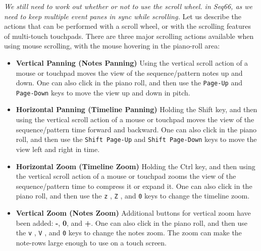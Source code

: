 \begin{itemize}
   \textsl{We still need to work out whether or not to use the scroll wheel.
   in Seq66, as we need to keep multiple event panes in sync while scrolling.}
   Let us describe the actions that can be performed with a
   scroll wheel, or with the scrolling features of multi-touch touchpads.
   There are three major scrolling actions available when using mouse
   scrolling, with the mouse hovering in the piano-roll area:

   \begin{itemize}
      \item \textbf{Vertical Panning (Notes Panning)}
         Using the vertical scroll action of a mouse or touchpad moves the
         view of the sequence/pattern notes up and down.
         One can also click in the piano roll, and then use the
         \texttt{Page-Up} 
         and \texttt{Page-Down} 
         keys to move the view up and down in pitch.
      \item \textbf{Horizontal Panning (Timeline Panning)}
         Holding the Shift key, and then using the vertical scroll action of a
         mouse or touchpad moves the view of the sequence/pattern time forward
         and backward.
         One can also click in the piano roll, and then use the
         \texttt{Shift Page-Up} 
         and \texttt{Shift Page-Down} 
         keys to move the view left and right in time.
      \item \textbf{Horizontal Zoom (Timeline Zoom)}
         Holding the Ctrl key, and then using the vertical scroll action of a
         mouse or touchpad zooms the view of the sequence/pattern time to
         compress it or expand it.
         One can also click in the piano roll, and then use the
         \texttt{z} ,
         \texttt{Z} , and
         \texttt{0}  keys to change the timeline zoom.
      \item \textbf{Vertical Zoom (Notes Zoom)}
         Additional buttons for vertical zoom have been added:
         \textbf{-},
         \textbf{0}, and
         \textbf{+}.
         One can also click in the piano roll, and then use the
         \texttt{v} ,
         \texttt{V} , and
         \texttt{0}  keys to change the notes zoom.
         The zoom can make the note-rows large enough to use on a touch screen.
   \end{itemize}


\end{itemize}
